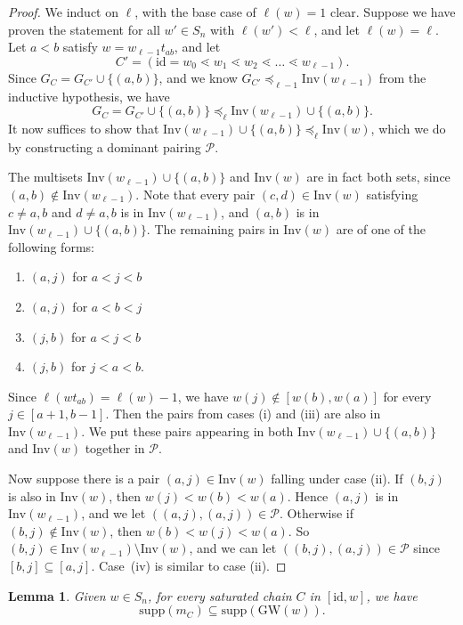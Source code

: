 \documentclass[11pt]{article}
\newtheorem{lemma}[theo]{Lemma}
\theoremstyle{definition}
\numberwithin{equation}{section}
\newcommand{\GW}{\mathrm{GW}}
\newcommand{\id}{\mathrm{id}}
\newcommand{\Inv}{\mathrm{Inv}}
\newcommand{\Pair}{\mathcal{P}}
\newcommand{\supp}{\mathrm{supp}}
\begin{document}
\begin{proof}
    We induct on $\ell$, with the base case of $\ell(w) = 1$ clear. Suppose we have proven the statement for all $w'\in S_n$ with $\ell(w') < \ell$, and let $\ell(w) = \ell$. Let $a < b$ satisfy $w=w_{\ell-1}t_{ab}$, and let 
    \[C'=(\id=w_0\lessdot w_1\lessdot w_2\lessdot \dots \lessdot w_{\ell-1}).\] 
    Since $G_C=G_{C'}\cup\{(a,b)\}$, and we know $G_{C'}\preceq_{\ell-1} \Inv(w_{\ell-1})$ from the inductive hypothesis, we have
    \[G_C=G_{C'}\cup\{(a,b)\}\preceq_{\ell}\Inv(w_{\ell-1})\cup\{(a,b)\}.\]
    It now suffices to show that $\Inv(w_{\ell-1})\cup\{(a,b)\}\preceq_{\ell} \Inv(w)$, which we do by constructing a dominant pairing $\Pair$.
     
    The multisets $\Inv(w_{\ell-1})\cup\{(a,b)\}$ and $\Inv(w)$ are in fact both sets, since $(a,b)\notin \Inv(w_{\ell-1})$.
    Note that every pair $(c, d)\in \Inv(w)$ satisfying $c\neq a, b$ and $d\neq a, b$ is in $\Inv(w_{\ell-1})$, and $(a,b)$ is in $\Inv(w_{\ell-1})\cup\{(a,b)\}$. The remaining pairs in $\Inv(w)$ are of one of the following forms:
    \begin{enumerate}[label=\textnormal{(\roman*)}]
        \item $(a,j)$ for $a<j<b$
        \item $(a,j)$ for $a<b<j$
        \item $(j,b)$ for $a<j<b$
        \item $(j,b)$ for $j<a<b$.
    \end{enumerate}

    Since $\ell(wt_{ab})=\ell(w)-1$, we have $w(j)\notin [w(b),w(a)]$ for every $j\in [a+1,b-1]$. Then the pairs from cases (i) and (iii) are also in $\Inv(w_{\ell-1})$.
    We put these pairs appearing in both $\Inv(w_{\ell-1})\cup\{(a,b)\}$ and $\Inv(w)$ together in $\Pair$. 

    Now suppose there is a pair $(a, j)\in\Inv(w)$ falling under case (ii). If $(b,j)$ is also in $\Inv(w)$, then $w(j) < w(b) < w(a)$. Hence $(a,j)$ is in $\Inv(w_{\ell-1})$, and we let $((a,j),(a,j))\in \Pair$. Otherwise if $(b,j)\notin \Inv(w)$, then $w(b) < w(j) < w(a)$. So $(b, j)\in \Inv(w_{\ell-1})\setminus \Inv(w)$, and we can let $((b,j),(a,j))\in \Pair$ since $[b,j]\subseteq[a,j]$. Case~(iv) is similar to case (ii).
\end{proof}

\begin{lemma}\label{lemma:chainNPcontainment}
    Given $w\in S_n$, for every saturated chain $C$ in $[\id, w]$, we have
    \[\supp(m_C)\subseteq \supp(\GW(w)).\]
\end{lemma}
\end{document}
